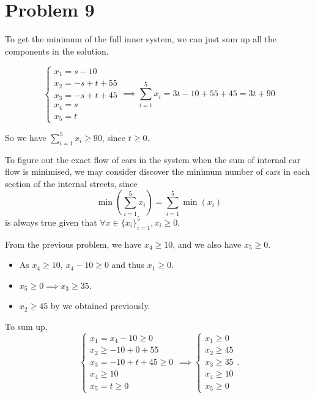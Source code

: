 \documentclass[12pt,a4paper]{article}
\begin{document}
\section*{Problem 9}
To get the minimum of the full inner system, we can just sum up all the components in the solution.
\begin{solution}
\[
\begin{cases}
x_1 = s - 10 \\
x_2 = -s + t + 55 \\
x_3 = -s + t + 45 \\
x_4 = s \\
x_5 = t
\end{cases}
\implies 
\sum_{i=1}^5 x_i = 3t -10 + 55 + 45 = 3t + 90 
\]

So we have $\sum_{i=1}^5 x_i \geq 90$, since $t \geq 0$.

To figure out the exact flow of cars in the system when the sum of internal car flow is minimised, we may consider discover the minimum number of cars in each section of the internal streets, since 
$$\min(\sum_{i=1}^5 x_i) = \sum_{i=1}^5\min(x_i)$$
is always true given that $\forall x\in \{x_i\}_{i=1}^5, x_i \geq 0$.

From the previous problem, we have $x_4 \geq 10$, and we also have $x_5\geq 0$. 
\begin{itemize}
    \item As $x_4 \geq 10$,  $x_4 - 10 \geq 0$ and thus $x_1 \geq 0$.
    \item $x_5 \geq 0 \implies x_3 \geq 35 $.
    \item $x_2 \geq 45$ by we obtained previously.

\end{itemize}
To sum up,
\begin{equation}
    \begin{cases}
        x_1 = x_4 -10 \geq 0\\
        x_2 \geq -10 + 0 + 55\\
        x_3 = -10 + t + 45 \geq 0\\
        x_4 \geq 10\\
        x_5 = t \geq 0
    \end{cases}
    \implies
    \begin{cases}
        x_1 \geq 0\\
        x_2 \geq 45\\
        x_3 \geq 35\\
        x_4 \geq 10\\
        x_5 \geq 0
    \end{cases}.
\end{equation}


\end{solution}
\end{document}

